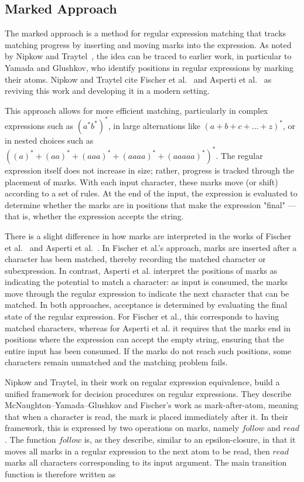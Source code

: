 \documentclass[12pt]{article}
\begin{document}
\FloatBarrier
\subsection{Marked Approach}

The marked approach is a method for regular expression matching that tracks 
matching progress by inserting and moving marks into the expression.  
As noted by Nipkow and Traytel~\cite{NipkowTraytel2014}, the idea can be traced
to earlier work, in particular to Yamada and Glushkov, who identify positions
in regular expressions by marking their atoms. Nipkow and Traytel cite Fischer et al.~\cite{Fischer2010} and
 Asperti et al.~\cite{Asperti2010} as reviving this work and developing it in a modern setting.

This approach allows for more efficient matching, particularly in complex
expressions such as $(a^*b^*)^*$, in large alternations like
$(a+b+c+\dots+z)^*$, or in nested choices such as
$((a)^* + (aa)^* + (aaa)^* + (aaaa)^* + (aaaaa)^*)^*$. The regular expression itself does not increase in size;
 rather, progress is tracked through the placement of marks.
With each input character, these marks move (or shift) according to a set of rules.  
At the end of the input, the expression is evaluated to determine whether the marks 
are in positions that make the expression "final" — that is, whether the expression accepts
 the string.

There is a slight difference in how marks are interpreted in the works of Fischer et al.~\cite{Fischer2010}  
and Asperti et al.~\cite{Asperti2010}.  
In Fischer et al.’s approach, marks are inserted after a character has been matched, thereby recording the matched character or subexpression.  
In contrast, Asperti et al. interpret the positions of marks as indicating the potential to match a character:  
as input is consumed, the marks move through the regular expression to indicate the next character that can be matched.  
In both approaches, acceptance is determined by evaluating the final state of the regular expression.  
For Fischer et al., this corresponds to having matched characters, whereas for Asperti et al. it requires that the marks end in positions  
where the expression can accept the empty string, ensuring that the entire input has been consumed.  
If the marks do not reach such positions, some characters remain unmatched and the matching problem fails.

Nipkow and Traytel, in their work on regular expression equivalence, 
build a unified framework for decision procedures on regular expressions. 
They describe McNaughton--Yamada--Glushkov and Fischer’s work as 
mark-after-atom, meaning that when a character is read, the mark is placed 
immediately after it. In their framework, this is expressed by two operations 
on marks, namely $follow$ and $read$. The function $follow$ is, as they 
describe, similar to an epsilon-closure, in that it moves all marks in a 
regular expression to the next atom to be read, then $read$ marks all 
characters corresponding to its input argument. The main transition function 
is therefore written as 
\end{document}
